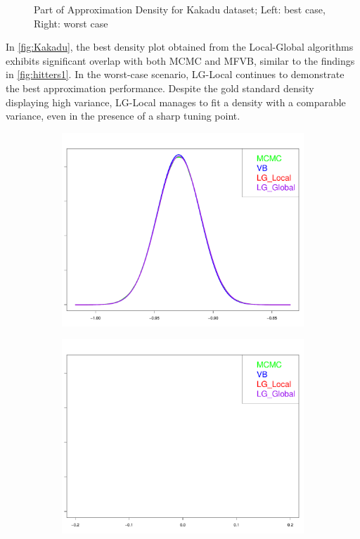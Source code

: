 \begin{figure}[h]
\begin{subfigure}{0.5\textwidth}
	\end{subfigure}
	\caption{Part of Approximation Density for Kakadu dataset; Left: best case, Right: worst case}
	\label{fig:Kakadu}
\end{figure}

In \autoref{fig:Kakadu}, the best density plot obtained from the Local-Global algorithms exhibits significant overlap with both MCMC and MFVB, similar to the findings in \autoref{fig:hitters1}. In the worst-case scenario, LG-Local continues to demonstrate the best approximation performance. Despite the gold standard density displaying high variance, LG-Local manages to fit a density with a comparable variance, even in the presence of a sharp tuning point.\\
\begin{figure}[h]
	\begin{subfigure}{0.5\textwidth}
		\centering
		\includegraphics[page = 1, width=\linewidth,keepaspectratio]{lasso_densities_Bodyfat.pdf}
	\end{subfigure}
	\begin{subfigure}{0.5\textwidth}
		\includegraphics[page = 8, width=\linewidth,keepaspectratio]{lasso_densities_Bodyfat-1.pdf}

\end{subfigure}
\end{figure}
